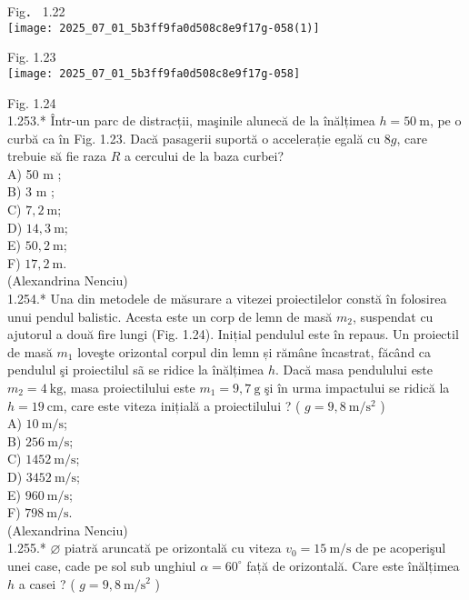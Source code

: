 {Fig． 1.22\\
\texttt{[image: 2025\_07\_01\_5b3ff9fa0d508c8e9f17g-058(1)]}

Fig. 1.23\\
\texttt{[image: 2025\_07\_01\_5b3ff9fa0d508c8e9f17g-058]}

Fig. 1.24\\
1.253.* Într-un parc de distracții, maşinile alunecă de la înălțimea $h=50 \mathrm{~m}$, pe o curbă ca în Fig. 1.23. Dacă pasagerii suportă o accelerație egală cu $8 g$, care trebuie să fie raza $R$ a cercului de la baza curbei?\\
A) 50 m ;\\
B) 3 m ;\\
C) $7,2 \mathrm{~m}$;\\
D) $14,3 \mathrm{~m}$;\\
E) $50,2 \mathrm{~m}$;\\
F) $17,2 \mathrm{~m}$.\\
(Alexandrina Nenciu)\\
1.254.* Una din metodele de măsurare a vitezei proiectilelor constă în folosirea unui pendul balistic. Acesta este un corp de lemn de masă $m_{2}$, suspendat cu ajutorul a două fire lungi (Fig. 1.24). Inițial pendulul este în repaus. Un proiectil de masă $m_{1}$ loveşte orizontal corpul din lemn și rămâne încastrat, făcând ca pendulul şi proiectilul sã se ridice la înălțimea $h$. Dacă masa pendulului este $m_{2}=4 \mathrm{~kg}$, masa proiectilului este $m_{1}=9,7 \mathrm{~g}$ şi în urma impactului se ridică la $h=19 \mathrm{~cm}$, care este viteza inițială a proiectilului ? ( $g=9,8 \mathrm{~m} / \mathrm{s}^{2}$ )\\
A) $10 \mathrm{~m} / \mathrm{s}$;\\
B) $256 \mathrm{~m} / \mathrm{s}$;\\
C) $1452 \mathrm{~m} / \mathrm{s}$;\\
D) $3452 \mathrm{~m} / \mathrm{s}$;\\
E) $960 \mathrm{~m} / \mathrm{s}$;\\
F) $798 \mathrm{~m} / \mathrm{s}$.\\
(Alexandrina Nenciu)\\
1.255.* $\varnothing$ piatră aruncată pe orizontală cu viteza $v_{0}=15 \mathrm{~m} / \mathrm{s}$ de pe acoperişul unei case, cade pe sol sub unghiul $\alpha=60^{\circ}$ față de orizontală. Care este înălțimea $h$ a casei ? ( $g=9,8 \mathrm{~m} / \mathrm{s}^{2}$ )\\
}
